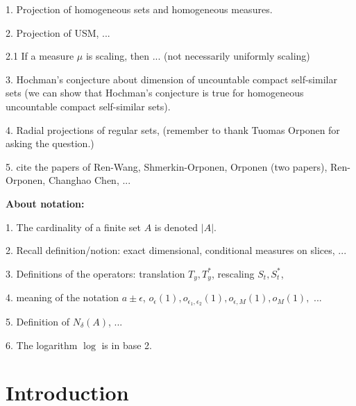 \documentclass[a4paper,11pt]{amsart}
\theoremstyle{definition}
\numberwithin{equation}{section}
\begin{document}
1.  Projection of homogeneous sets and homogeneous measures.

2.   Projection of USM, ...

2.1 If a measure $\mu$ is scaling, then ...  (not necessarily uniformly scaling) 

3.  Hochman's conjecture about dimension of uncountable compact self-similar sets (we can show that Hochman's conjecture is true for homogeneous uncountable compact self-similar sets).

4. Radial projections of regular sets,  (remember to thank Tuomas Orponen for asking the question.)

5.  cite the papers of Ren-Wang,  Shmerkin-Orponen,  Orponen (two papers),  Ren-Orponen,  Changhao Chen, ...

{\bf {\color{blue}About notation:}}

1. The cardinality of a finite set $A$ is denoted  $|A|$.

2.  Recall definition/notion: exact dimensional,  conditional measures on slices, ...

3.  Definitions of the operators: translation $T_y,T_y^*$,  rescaling $S_t,S_t^*$,  

4.  meaning of the notation $a\pm \epsilon$,  $o_\epsilon(1),  o_{\epsilon_1,\epsilon_2}(1),  o_{\epsilon, M}(1),  o_M(1),  $ ...

5.  Definition of $N_{\delta}(A)$, ...

6.  The logarithm $\log$ is in base 2.
\fi

\section{Introduction}
\end{document}
